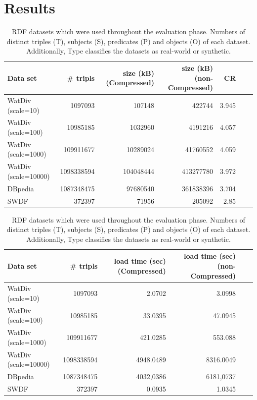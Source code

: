 \section{Results}
\label{sec:results}


\begin{table}[h]
	\setlength{\tabcolsep}{1ex}
	\begin{tabular}{lrrrrrl}
		\toprule
		Data set& \# tripls & size (kB) (Compressed) &size (kB) (non-Compressed)& CR\\
		\midrule
		WatDiv (scale=10) &  1097093& 	107148	& 422744& 	3.945 \\ %
		WatDiv (scale=100) & 10985185&	1032960	&4191216&	4.057  \\ %
		WatDiv (scale=1000) & 109911677	&10289024&	41760552&	4.059 \\ 
		WatDiv (scale=10000) & 1098338594&	104048444	&413277780&	3.972\\ 
		DBpedia  & 1087348475	&97680540&	361838396&	3.704&\\ 
		SWDF  & 372397&	71956&	205092	&2.85\\ 
		\bottomrule
	\end{tabular}
	\caption{RDF datasets which were used throughout the evaluation phase. Numbers of distinct triples (T), subjects (S), predicates (P) and objects (O) of each dataset. Additionally, Type classifies the datasets as real-world or synthetic. }
	\label{tab:result_table_size}
\end{table}

\begin{table}[h]
	\setlength{\tabcolsep}{1ex}
	\begin{tabular}{lrrrrl}
		\toprule
		Data set& \# tripls & load time (sec) (Compressed) & load time (sec) (non-Compressed) \\
		\midrule
		WatDiv (scale=10) &  1097093& 	2.0702	& 3.0998 \\ %
		WatDiv (scale=100) & 10985185&	33.0395	& 47.0945  \\ %
		WatDiv (scale=1000) & 109911677	&421.0285	& 553.088 \\ 
		WatDiv (scale=10000)& 1098338594 & 4948.0489	& 8316.0049\\ 
		DBpedia  & 1087348475	&4032,0386& 	6181,0737\\ 
		SWDF  & 372397&	0.0935& 1.0345\\ 
		\bottomrule
	\end{tabular}
	\caption{RDF datasets which were used throughout the evaluation phase. Numbers of distinct triples (T), subjects (S), predicates (P) and objects (O) of each dataset. Additionally, Type classifies the datasets as real-world or synthetic. }
	\label{tab:result_table_load_speed}
\end{table}


